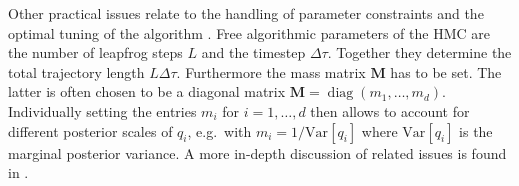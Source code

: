 \par %
Other practical issues relate to the handling of parameter constraints \cite{MCMC:Pakman2014,MCMC:Lan2014} and the optimal tuning of the algorithm \cite{MCMC:Beskos2013:a,MCMC:Betancourt2014:arXiv}.
Free algorithmic parameters of the HMC are the number of leapfrog steps \(L\) and the timestep \(\Delta\tau\).
Together they determine the total trajectory length \(L \Delta\tau\).
Furthermore the mass matrix \(\bm{M}\) has to be set.
The latter is often chosen to be a diagonal matrix \(\bm{M} = \operatorname{diag}(m_1,\ldots,m_d)\).
Individually setting the entries \(m_i\) for \(i=1,\ldots,d\) then allows to account for different posterior scales of \(q_i\),
e.g.\ with \(m_i = 1/\mathrm{Var}[q_i]\) where \(\mathrm{Var}[q_i]\) is the marginal posterior variance.
A more in-depth discussion of related issues is found in \cite{MCMC:Neal2011}.
